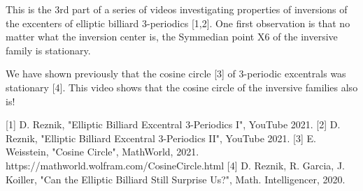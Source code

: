 This is the 3rd part of a series of videos investigating properties of inversions of the excenters of elliptic billiard 3-periodics [1,2]. One first observation is that no matter what the inversion center is, the Symmedian point X6 of the inversive family is stationary.

We have shown previously that the cosine circle [3] of 3-periodic excentrals was stationary [4]. This video shows that the cosine circle of the inversive families also is!

[1] D. Reznik, "Elliptic Billiard Excentral 3-Periodics I", YouTube 2021.
[2] D. Reznik, "Elliptic Billiard Excentral 3-Periodics II", YouTube 2021.
[3] E. Weisstein, "Cosine Circle", MathWorld, 2021. https://mathworld.wolfram.com/CosineCircle.html
[4] D. Reznik, R. Garcia, J. Koiller, "Can the Elliptic Billiard Still Surprise Us?", Math. Intelligencer, 2020.